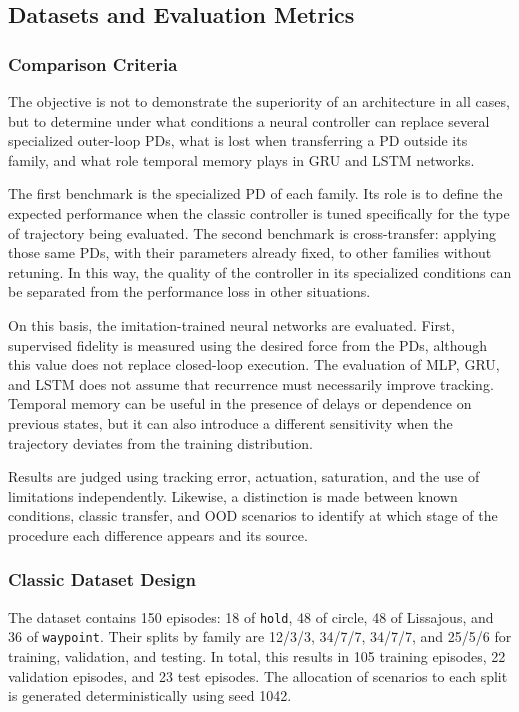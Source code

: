 \subsection{Datasets and Evaluation Metrics}
\label{subsec:datos-metricas}

\subsubsection*{Comparison Criteria}

The objective is not to demonstrate the superiority of an architecture in all cases, but to determine under what conditions a neural controller can replace several specialized outer-loop PDs, what is lost when transferring a PD outside its family, and what role temporal memory plays in GRU and LSTM networks.

The first benchmark is the specialized PD of each family. Its role is to define the expected performance when the classic controller is tuned specifically for the type of trajectory being evaluated. The second benchmark is cross-transfer: applying those same PDs, with their parameters already fixed, to other families without retuning. In this way, the quality of the controller in its specialized conditions can be separated from the performance loss in other situations.

On this basis, the imitation-trained neural networks are evaluated. First, supervised fidelity is measured using the desired force from the PDs, although this value does not replace closed-loop execution. The evaluation of MLP, GRU, and LSTM does not assume that recurrence must necessarily improve tracking. Temporal memory can be useful in the presence of delays or dependence on previous states, but it can also introduce a different sensitivity when the trajectory deviates from the training distribution.

Results are judged using tracking error, actuation, saturation, and the use of limitations independently. Likewise, a distinction is made between known conditions, classic transfer, and OOD scenarios to identify at which stage of the procedure each difference appears and its source.

\subsubsection*{Classic Dataset Design}
\label{subsubsec:diseno-dataset-clasico}

The dataset contains 150 episodes: 18 of \texttt{hold}, 48 of circle, 48 of Lissajous, and 36 of \texttt{waypoint}. Their splits by family are 12/3/3, 34/7/7, 34/7/7, and 25/5/6 for training, validation, and testing. In total, this results in 105 training episodes, 22 validation episodes, and 23 test episodes. The allocation of scenarios to each split is generated deterministically using seed 1042.

